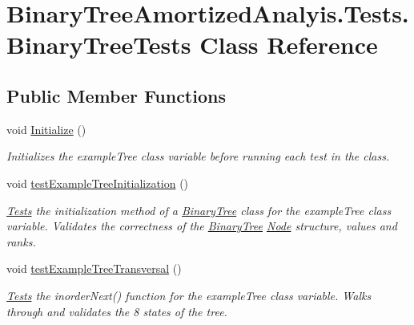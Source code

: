 \hypertarget{class_binary_tree_amortized_analyis_1_1_tests_1_1_binary_tree_tests}{}\section{Binary\+Tree\+Amortized\+Analyis.\+Tests.\+Binary\+Tree\+Tests Class Reference}
\label{class_binary_tree_amortized_analyis_1_1_tests_1_1_binary_tree_tests}
\subsection*{Public Member Functions}
\begin{DoxyCompactItemize}
\item 
void \hyperlink{class_binary_tree_amortized_analyis_1_1_tests_1_1_binary_tree_tests_a5c4b1fd0b2a5b81ded816d813d6910ae}{Initialize} ()
\begin{DoxyCompactList}\small\item\em Initializes the example\+Tree class variable before running each test in the class. \end{DoxyCompactList}\item 
void \hyperlink{class_binary_tree_amortized_analyis_1_1_tests_1_1_binary_tree_tests_aa00b7ba83e27a0cc80418f89e343da82}{test\+Example\+Tree\+Initialization} ()
\begin{DoxyCompactList}\small\item\em \hyperlink{namespace_binary_tree_amortized_analyis_1_1_tests}{Tests} the initialization method of a \hyperlink{class_binary_tree_amortized_analyis_1_1_binary_tree}{Binary\+Tree} class for the example\+Tree class variable. Validates the correctness of the \hyperlink{class_binary_tree_amortized_analyis_1_1_binary_tree}{Binary\+Tree} \hyperlink{class_binary_tree_amortized_analyis_1_1_node}{Node} structure, values and ranks. \end{DoxyCompactList}\item 
void \hyperlink{class_binary_tree_amortized_analyis_1_1_tests_1_1_binary_tree_tests_a4043ad8f07e661f8676054ce4b202e50}{test\+Example\+Tree\+Transversal} ()
\begin{DoxyCompactList}\small\item\em \hyperlink{namespace_binary_tree_amortized_analyis_1_1_tests}{Tests} the inorder\+Next() function for the example\+Tree class variable. Walks through and validates the 8 states of the tree. \end{DoxyCompactList}\item 

\end{DoxyCompactItemize}
